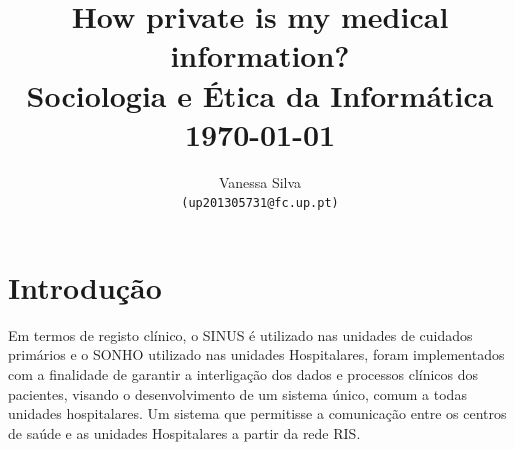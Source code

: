 \documentclass[conference]{IEEEtran}
\begin{document}
%
%

\title{How private is my medical information?\\
	\vspace*{10pt} \large Sociologia e Ética da Informática\\
		\normalsize \today{} }
%
\author{Vanessa Silva\\
	{\texttt{(up201305731@fc.up.pt)}}\\
}

\maketitle



\begin{abstract}


\end{abstract}



\IEEEpeerreviewmaketitle


\section{Introdução}


Em termos de registo clínico, o SINUS é utilizado nas unidades de cuidados primários e o SONHO utilizado nas unidades Hospitalares, foram implementados com a finalidade de garantir a interligação dos dados e processos clínicos dos pacientes, visando o desenvolvimento de um sistema único, comum a todas unidades hospitalares. Um sistema que permitisse a comunicação entre os centros de saúde e as unidades Hospitalares a partir da rede RIS.
\end{document}
